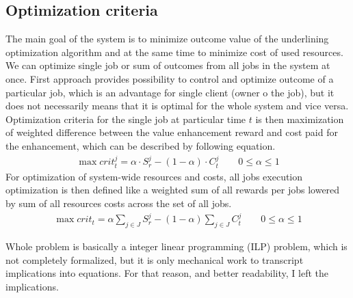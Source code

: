 \subsection{Optimization criteria}\label{subsec:optimization-criteria}
The main goal of the system is to minimize outcome value of the underlining optimization algorithm
and at the same time to minimize cost of used resources.
We can optimize single job or sum of outcomes from all jobs in the system at once.
First approach provides possibility to control and optimize outcome of a particular job,
which is an advantage for single client (owner o the job),
but it does not necessarily means that it is optimal for the whole system and vice versa.
Optimization criteria for the single job at particular time $t$ is then
maximization of weighted difference between the value enhancement reward 
and cost paid for the enhancement,
which can be described by following equation.
\begin{align*}
	\max crit_{t}^{j} = \alpha \cdot S_{r}^{j} - (1 - \alpha) \cdot C_{t}^{j} \qquad 0 \leq \alpha \leq 1 
\end{align*}
For optimization of system-wide resources and costs,
all jobs execution optimization is then defined like a
weighted sum of all rewards per jobs lowered by sum of all resources costs across the set of all jobs.
\begin{align*}
	\max crit_{t} = \alpha \sum_{j \in J} S_{r}^{j} - (1 - \alpha) \sum_{j \in J} C_{t}^{j} \qquad 0 \leq \alpha \leq 1 
\end{align*}

\bigskip

Whole problem is basically a integer linear programming (ILP) problem, 
which is not completely formalized, 
but it is only mechanical work to transcript implications into equations.
For that reason, and better readability, I left the implications.